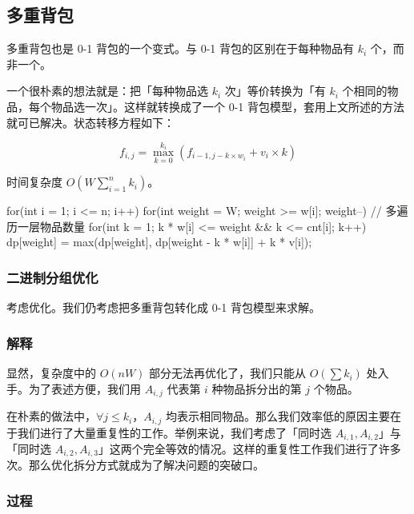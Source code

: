 \subsection{多重背包}\label{ux591aux91cdux80ccux5305}

多重背包也是 0-1 背包的一个变式。与 0-1 背包的区别在于每种物品有 \(k_i\) 个，而非一个。

一个很朴素的想法就是：把「每种物品选 \(k_i\) 次」等价转换为「有 \(k_i\) 个相同的物品，每个物品选一次」。这样就转换成了一个 0-1 背包模型，套用上文所述的方法就可已解决。状态转移方程如下：

\[
f_{i,j}=\max_{k=0}^{k_i}(f_{i-1,j-k\times w_i}+v_i\times k)
\]

时间复杂度 \(O(W\sum_{i=1}^nk_i)\)。


\begin{codeline}
for(int i = 1; i <= n; i++) {
    for(int weight = W; weight >= w[i]; weight--) {
        // 多遍历一层物品数量
        for(int k = 1; k * w[i] <= weight && k <= cnt[i]; k++) {
            dp[weight] = max(dp[weight], dp[weight - k * w[i]] + k * v[i]);
        }
    }
}
\end{codeline}


\subsubsection{二进制分组优化}\label{ux4e8cux8fdbux5236ux5206ux7ec4ux4f18ux5316}

考虑优化。我们仍考虑把多重背包转化成 0-1 背包模型来求解。

\subsubsection{解释}\label{ux89e3ux91ca-2}

显然，复杂度中的 \(O(nW)\) 部分无法再优化了，我们只能从 \(O(\sum k_i)\) 处入手。为了表述方便，我们用 \(A_{i,j}\) 代表第 \(i\) 种物品拆分出的第 \(j\) 个物品。

在朴素的做法中，\(\forall j\le k_i\)，\(A_{i,j}\) 均表示相同物品。那么我们效率低的原因主要在于我们进行了大量重复性的工作。举例来说，我们考虑了「同时选 \(A_{i,1},A_{i,2}\)」与「同时选 \(A_{i,2},A_{i,3}\)」这两个完全等效的情况。这样的重复性工作我们进行了许多次。那么优化拆分方式就成为了解决问题的突破口。

\subsubsection{过程}\label{ux8fc7ux7a0b-1}

